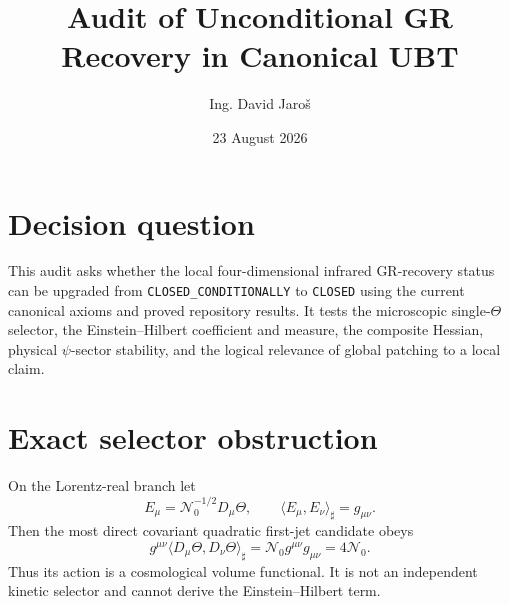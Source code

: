 \documentclass[11pt,a4paper]{article}
\title{Audit of Unconditional GR Recovery in Canonical UBT}
\author{Ing. David Jaro\v{s}}
\date{23 August 2026}
\begin{document}
\maketitle
\UBTProvenanceNotice

\section{Decision question}
This audit asks whether the local four-dimensional infrared GR-recovery status
can be upgraded from \texttt{CLOSED\_CONDITIONALLY} to \texttt{CLOSED} using
the current canonical axioms and proved repository results.  It tests the
microscopic single-$\Theta$ selector, the Einstein--Hilbert coefficient and
measure, the composite Hessian, physical $\psi$-sector stability, and the
logical relevance of global patching to a local claim.

\section{Exact selector obstruction}
On the Lorentz-real branch let
\begin{equation}
 E_\mu=\mathcal N_0^{-1/2}D_\mu\Theta,
 \qquad \langle E_\mu,E_\nu\rangle_\sharp=g_{\mu\nu}.
\end{equation}
Then the most direct covariant quadratic first-jet candidate obeys
\begin{equation}\label{eq:collapse}
 g^{\mu\nu}\langle D_\mu\Theta,D_\nu\Theta\rangle_\sharp
 =\mathcal N_0 g^{\mu\nu}g_{\mu\nu}=4\mathcal N_0.
\end{equation}
Thus its action is a cosmological volume functional.  It is not an independent
kinetic selector and cannot derive the Einstein--Hilbert term.
\end{document}
